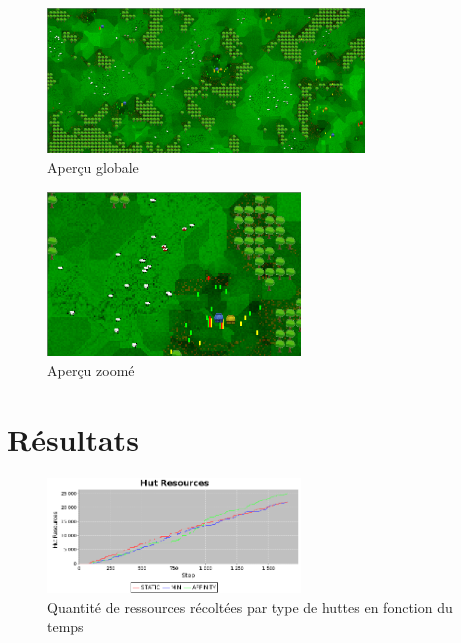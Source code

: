   \begin{figure}[H]
    \begin{center}
      \includegraphics[width=0.75\textwidth]{./img/monde1}
      \caption{Aperçu globale}
    \end{center}
  \end{figure}

  \begin{figure}[H]
    \begin{center}
      \includegraphics[width=0.6\textwidth]{./img/monde2}
      \caption{Aperçu zoomé}
    \end{center}
  \end{figure}

\section{Résultats}

  \begin{figure}[H]
    \begin{center}
      \includegraphics[width=0.6\textwidth]{./img/graph_ressources}
      \caption{Quantité de ressources récoltées par type de huttes en
    fonction du temps} 
      \label{fig:resultat}
    \end{center}
  \end{figure}

